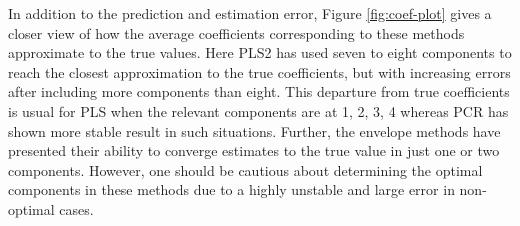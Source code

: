 \documentclass[12pt,3p,authoryear]{elsarticle}
\begin{document}
In addition to the prediction and estimation error, Figure \ref{fig:coef-plot} gives a closer view of how the average coefficients corresponding to these methods approximate to the true values. Here PLS2 has used seven to eight components to reach the closest approximation to the true coefficients, but with increasing errors after including more components than eight. This departure from true coefficients is usual for PLS when the relevant components are at 1, 2, 3, 4 whereas PCR has shown more stable result in such situations. Further, the envelope methods have presented their ability to converge estimates to the true value in just one or two components. However, one should be cautious about determining the optimal components in these methods due to a highly unstable and large error in non-optimal cases.

\begin{table}[t]


\end{table}
\end{document}
